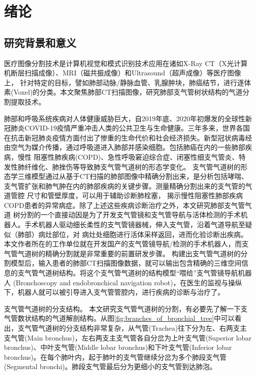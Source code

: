 
\chapter{绪论}\label{chap:introduction}

\section{研究背景和意义}

医疗图像分割技术是计算机视觉和模式识别技术应用在诸如X-Ray CT（X光计算机断层扫描成像）、MRI（磁共振成像）和Ultrasound（超声成像）等医疗图像上，
针对特定的目标，譬如肺部动脉/静脉血管、乳腺肿块，肺癌结节，进行逐体素(Voxel)的分类。本文聚焦肺部CT扫描图像，研究肺部支气管树状结构的气道分割提取技术。


肺部和呼吸系统疾病对人体健康威胁巨大，自2019年底、2020年初爆发的全球性新冠肺炎COVID-19疫情严重冲击人类的公共卫生与生命健康。三年多来，世界各国在抗击新冠肺炎疫情方面付出了惨重的生命代价和社会经济损失。新型冠状病毒经由空气为媒介传播，通过呼吸道进入肺部并感染细胞。包括肺癌在内的一些肺部疾病，慢性
阻塞性肺疾病(COPD)\cite{fetita2004pulmonary}、急性呼吸窘迫综合症\cite{howling1998significance}、闭塞性细支气管炎\cite{shaw2002role}、特发性肺纤维化\cite{wu2019computed}、肺挫伤\cite{li2019application}等导致肺支气管气道树的形态学变化。
支气管气道树的形态学三维模型通过从基于CT扫描的肺部图像中精确分割出来，是分析包括哮喘、支气管扩张和肺气肿在内的肺部疾病的关键步骤。测量精确分割出来的支气管的气道管腔
尺寸和管壁厚度，可以用于辅助诊断肺栓塞\cite{estepar2013computed}， 揭示慢性阻塞性肺部疾病COPD患者的异常病症。除了上述这些疾病诊断治疗之外，本文研究肺部支气管气道
树分割的一个直接动因是为了开发支气管镜和支气管导航与活体检测的手术机器人。手术机器人驱动细长柔性的支气管镜器械，伸入支气管，沿着气道导航至疑似（肺部）病灶部位，对
病灶处细胞进行活体采样返回，进而化验诊断出疾病。本文作者所在的工作单位就在开发国产的支气管镜导航/检测的手术机器人，而支气管气道树的精确分割就是非常重要的前置研发步骤。
构建出支气管气道树的分割模型后，输入患者的肺部CT扫描图像数据，就可以输出包含精确的三维空间信息的支气管气道树结构。将这个支气管气道树的结构模型“喂给”支气管镜导航机器人
(Bronchoscopy and endobronchical navigation robot)，在医生的监视与操纵下，机器人就可以被引导进入支气管管腔内，进行疾病的诊断与治疗了。

{\heiti 支气管气道树的分支结构。} 本文研究支气管气道树的分割，有必要先了解一下支气管数状结构的气道解剖结构。从图\ref{fig:branches_of_bronchial_tree}中可以看出，支气管气道树的分支结构非常复杂，从气管(Trachea)往下分为左、右两支主支气管(Main bronchus)，左右两支主支气管各自分岔为上叶支气管(Superior lobar bronchus)、中叶支气管(Middle lobar bronchus)和下叶支气管(Inferior
 lobar bronchus)。在每个肺叶内，起于肺叶的支气管继续分岔为多个肺段支气管(Segmental bronchi)。肺段支气管最后分为更细小的支气管到达肺泡。

